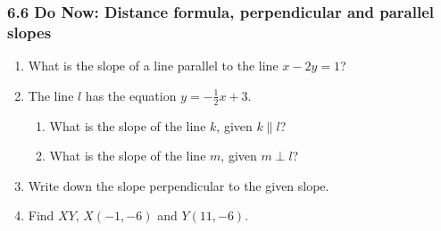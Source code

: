 \documentclass[12pt, twoside]{article}
\begin{document}
\subsubsection*{6.6 Do Now: Distance formula, perpendicular and parallel slopes}
  \begin{enumerate}

    \item What is the slope of a line parallel to the line $x-2y=1$?  \vspace{2cm}
    
    \item The line $l$ has the equation $y=-\frac{1}{2} x+3$.
    \begin{enumerate}
      \item What is the slope of the line $k$, given $k \parallel l$?
      \vspace{1.3cm}
      \item What is the slope of the line $m$, given $m \perp l$?
      \vspace{1.3cm}
    \end{enumerate}

    \item Write down the slope perpendicular to the given slope.
    \begin{enumerate}
    \end{enumerate} \vspace{1cm}

    \item Find $XY$, $X(-1,-6)$ and $Y(11,-6)$. \hspace{0.5cm}
     \vspace{1cm}


\end{enumerate}
\end{document}
